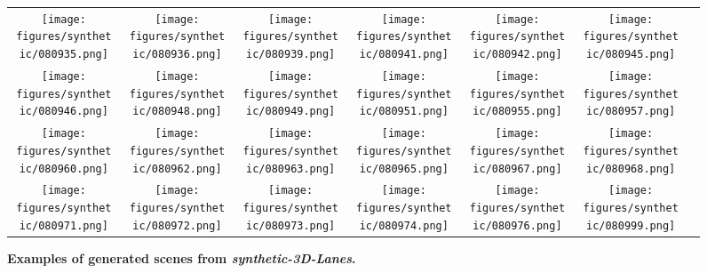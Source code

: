\documentclass[10pt,twocolumn,letterpaper]{article}
\begin{document}
\begin{figure*}
	\begin{center}
		\begin{tabular}{ccccccc}
			\texttt{[image: figures/synthetic/080935.png]} &
			\texttt{[image: figures/synthetic/080936.png]} &
\texttt{[image: figures/synthetic/080939.png]} &
			\texttt{[image: figures/synthetic/080941.png]} &
			\texttt{[image: figures/synthetic/080942.png]} &
			\texttt{[image: figures/synthetic/080945.png]} \\
			\texttt{[image: figures/synthetic/080946.png]} &
			\texttt{[image: figures/synthetic/080948.png]} &
			\texttt{[image: figures/synthetic/080949.png]} &
			\texttt{[image: figures/synthetic/080951.png]} &
\texttt{[image: figures/synthetic/080955.png]} &
			\texttt{[image: figures/synthetic/080957.png]} \\
			\texttt{[image: figures/synthetic/080960.png]} &
			\texttt{[image: figures/synthetic/080962.png]} &
			\texttt{[image: figures/synthetic/080963.png]} &
\texttt{[image: figures/synthetic/080965.png]} &
			\texttt{[image: figures/synthetic/080967.png]} &
			\texttt{[image: figures/synthetic/080968.png]} \\
\texttt{[image: figures/synthetic/080971.png]} &
			\texttt{[image: figures/synthetic/080972.png]} &
			\texttt{[image: figures/synthetic/080973.png]} &
			\texttt{[image: figures/synthetic/080974.png]} &
			\texttt{[image: figures/synthetic/080976.png]} &
\texttt{[image: figures/synthetic/080999.png]} \\
\end{tabular} 
	\end{center}
	\caption{\textbf{Examples of generated scenes from \textit{synthetic-3D-Lanes}.}}
	\label{fig:examples}
	
\end{figure*}
\end{document}
